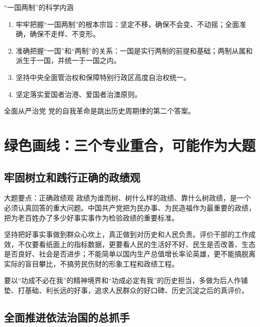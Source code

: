 \documentclass[12pt,a4paper]{ctexart}
\begin{document}
\begin{yellowbox}{“一国两制”的科学内涵}
\begin{enumerate}
  \item 牢牢把握“一国两制”的根本宗旨：坚定不移，确保不会变、不动摇；全面准确，确保不走样、不变形。
  \item 准确把握“一国”和“两制”的关系：一国是实行两制的前提和基础；两制从属和派生于一国，并统一于一国之内。
  \item 坚持中央全面管治权和保障特别行政区高度自治权统一。
  \item 坚定落实爱国者治港、爱国者治澳原则。
\end{enumerate}
\end{yellowbox}

\begin{yellowbox}{全面从严治党}
党的自我革命是跳出历史周期律的第二个答案。
\end{yellowbox}

\section{绿色画线：三个专业重合，可能作为大题}

\subsection{牢固树立和践行正确的政绩观}

\begin{greenlinebox}{大题要点：正确政绩观}
政绩为谁而树、树什么样的政绩、靠什么树政绩，是一个必须认真回答的重大问题。中国共产党把为民办事、为民造福作为最重要的政绩，把为老百姓办了多少好事实事作为检验政绩的重要标准。

坚持把好事实事做到群众心坎上，真正做到对历史和人民负责。评价干部的工作成效，不仅要看纸面上的指标数据，更要看人民的生活好不好、民生是否改善、生态是否良好、社会是否进步；不能简单以国内生产总值增长率论英雄，更不能搞脱离实际的盲目攀比，不搞劳民伤财的形象工程和政绩工程。

要以“功成不必在我”的精神境界和“功成必定有我”的历史担当，多做为后人作铺垫、打基础、利长远的好事，追求人民群众的好口碑、历史沉淀之后的真评价。
\end{greenlinebox}

\subsection{全面推进依法治国的总抓手}
\end{document}

